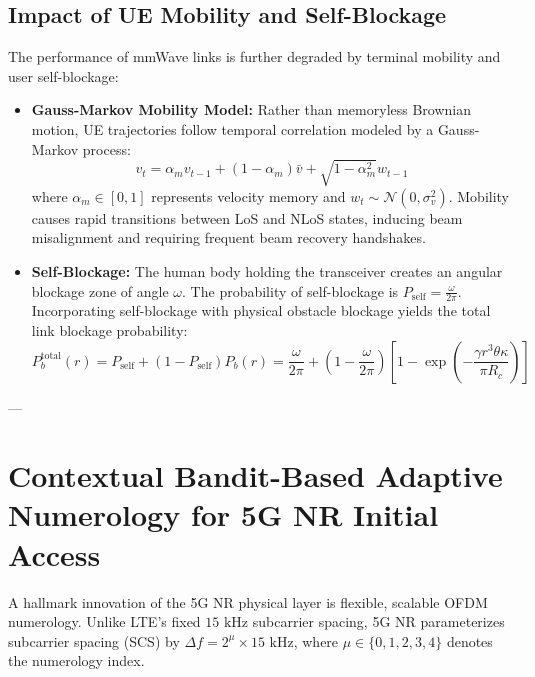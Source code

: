 \subsection{Impact of UE Mobility and Self-Blockage}
The performance of mmWave links is further degraded by terminal mobility and user self-blockage:
\begin{itemize}
    \item \textbf{Gauss-Markov Mobility Model:} Rather than memoryless Brownian motion, UE trajectories follow temporal correlation modeled by a Gauss-Markov process:
    \begin{equation}
        v_t = \alpha_m v_{t-1} + (1 - \alpha_m) \bar{v} + \sqrt{1 - \alpha_m^2} w_{t-1}
    \end{equation}
    where $\alpha_m \in [0, 1]$ represents velocity memory and $w_t \sim \mathcal{N}(0, \sigma_v^2)$. Mobility causes rapid transitions between LoS and NLoS states, inducing beam misalignment and requiring frequent beam recovery handshakes.
    \item \textbf{Self-Blockage:} The human body holding the transceiver creates an angular blockage zone of angle $\omega$. The probability of self-blockage is $P_{\mathrm{self}} = \frac{\omega}{2\pi}$. Incorporating self-blockage with physical obstacle blockage yields the total link blockage probability:
    \begin{equation}
        P_b^{\mathrm{total}}(r) = P_{\mathrm{self}} + (1 - P_{\mathrm{self}}) P_b(r) = \frac{\omega}{2\pi} + \left( 1 - \frac{\omega}{2\pi} \right) \left[ 1 - \exp\left( -\frac{\gamma r^3 \theta \kappa}{\pi R_c} \right) \right]
    \end{equation}
\end{itemize}

---

\section{Contextual Bandit-Based Adaptive Numerology for 5G NR Initial Access}
\label{sec:5g_adaptive_numerology}

A hallmark innovation of the 5G NR physical layer is flexible, scalable OFDM numerology. Unlike LTE's fixed $15\text{~kHz}$ subcarrier spacing, 5G NR parameterizes subcarrier spacing (SCS) by $\Delta f = 2^\mu \times 15\text{~kHz}$, where $\mu \in \{0, 1, 2, 3, 4\}$ denotes the numerology index.

